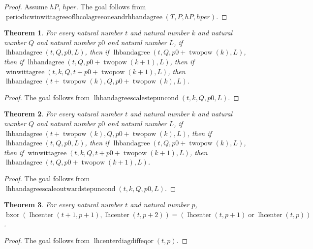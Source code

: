 \documentclass[11pt]{article}
\newtheorem{theorem}{Theorem}[section]
\theoremstyle{definition}
\begin{document}
\begin{proof}
Assume \(hP\), \(hper\).
The goal follows from \(\operatorname{periodicwinwittagreeoflhcolagreeoneandrhbandagree}(T, P, hP, hper)\).
\end{proof}
\begin{theorem}
\label{ll:paper:lhbandagree-scale-step-uncond}
For every natural number \(t\) and natural number \(k\) and natural number \(Q\) and natural number \(p0\) and natural number \(L\), if \(\operatorname{lhbandagree}(t, Q, p0, L)\), then if \(\operatorname{lhbandagree}(t, Q, p0 + \operatorname{twopow}(k), L)\), then if \(\operatorname{lhbandagree}(t, Q, p0 + \operatorname{twopow}(k + 1), L)\), then if \(\operatorname{winwittagree}(t, k, Q, t + p0 + \operatorname{twopow}(k + 1), L)\), then \(\operatorname{lhbandagree}(t + \operatorname{twopow}(k), Q, p0 + \operatorname{twopow}(k), L)\).
\end{theorem}
\begin{proof}
The goal follows from \(\operatorname{lhbandagreescalestepuncond}(t, k, Q, p0, L)\).
\end{proof}
\begin{theorem}
\label{ll:paper:lhbandagree-scale-outward-step-uncond}
For every natural number \(t\) and natural number \(k\) and natural number \(Q\) and natural number \(p0\) and natural number \(L\), if \(\operatorname{lhbandagree}(t + \operatorname{twopow}(k), Q, p0 + \operatorname{twopow}(k), L)\), then if \(\operatorname{lhbandagree}(t, Q, p0, L)\), then if \(\operatorname{lhbandagree}(t, Q, p0 + \operatorname{twopow}(k), L)\), then if \(\operatorname{winwittagree}(t, k, Q, t + p0 + \operatorname{twopow}(k + 1), L)\), then \(\operatorname{lhbandagree}(t, Q, p0 + \operatorname{twopow}(k + 1), L)\).
\end{theorem}
\begin{proof}
The goal follows from \(\operatorname{lhbandagreescaleoutwardstepuncond}(t, k, Q, p0, L)\).
\end{proof}
\begin{theorem}
\label{ll:paper:lhcenter-diag-diff-eq-or}
For every natural number \(t\) and natural number \(p\), \(\operatorname{bxor}(\operatorname{lhcenter}(t + 1, p + 1), \operatorname{lhcenter}(t, p + 2)) = (\operatorname{lhcenter}(t, p + 1) \operatorname{or} \operatorname{lhcenter}(t, p))\).
\end{theorem}
\begin{proof}
The goal follows from \(\operatorname{lhcenterdiagdiffeqor}(t, p)\).
\end{proof}
\end{document}
